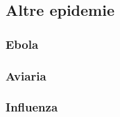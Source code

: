 \subsection{Altre epidemie}

\subsubsection{Ebola}

\subsubsection{Aviaria}

\subsubsection{Influenza}